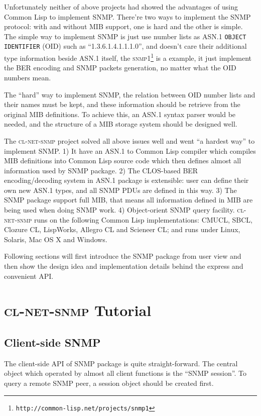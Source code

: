 \documentclass[reprint,9pt]{sigplanconf}
\begin{document}
Unfortunately neither of above projects had showed the advantages of using
Common Lisp to implement SNMP. There're two ways to implement the SNMP protocol:
with and without MIB support, one is hard and the other is simple. The simple
way to implement SNMP is just use number lists as ASN.1 \texttt{OBJECT IDENTIFIER} (OID)
such as ``1.3.6.1.4.1.1.1.0'', and doesn't care their additional type information
beside ASN.1 itself, the
\textsc{snmp1}\footnote{\texttt{http://common-lisp.net/projects/snmp1}} is
a example, it just implement the BER encoding and SNMP packets
generation, no matter what the OID numbers mean.

The ``hard'' way to implement SNMP, the relation between OID number lists
and their names must be kept, and these information should be retrieve from the
original MIB definitions. To achieve this, an ASN.1 syntax parser would be needed,
and the structure of a MIB storage system should be designed well.

The \textsc{cl-net-snmp} project solved all above issues well and went
``a hardest way'' to implement SNMP. 1) It have an ASN.1 to Common Lisp
compiler which compiles MIB definitions into Common Lisp source code which
then defines almost all information used by SNMP package. 2) The CLOS-based BER
encoding/decoding system in ASN.1 package is extensible: user can define their
own new ASN.1 types, and all SNMP PDUs are defined in this way. 3) The SNMP
package support full MIB, that means all information defined in
MIB are being used when doing SNMP work. 4) Object-orient SNMP query facility.
\textsc{cl-net-snmp} runs on the following Common Lisp
implementations: CMUCL, SBCL, Clozure CL, LispWorks, Allegro CL and
Scieneer CL; and runs under Linux, Solaris, Mac OS X and Windows.

Following sections will first introduce the SNMP package from user view
and then show the design idea and implementation details behind
the express and convenient API.

\section{\textsc{cl-net-snmp} Tutorial}

\subsection{Client-side SNMP}

The client-side API of SNMP package is quite straight-forward. The
central object which operated by almost all client functions is the
``SNMP session''. To query a remote SNMP peer, a session object should
be created first.
\end{document}
